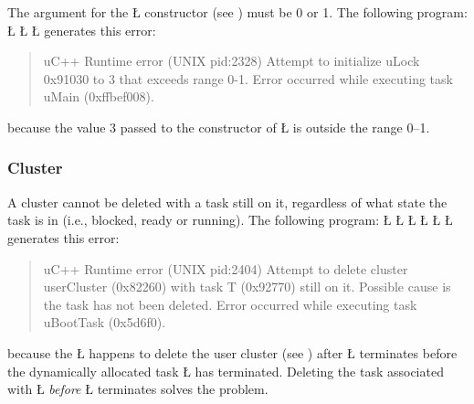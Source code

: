 \documentclass[openright,twoside]{report}
\begin{document}
The argument for the \LGinlinetrue\LGbegin\lgrinde\L{}\endlgrinde\LGend{} constructor (see ) must be 0 or 1.
The following program:
\LGinlinefalse\LGbegin\lgrinde
\L{}
\L{\LB{}}
\L{\LB{\}}}
\endlgrinde\LGend
generates this error:
\begin{quote}
\BGfont
uC++ Runtime error (UNIX pid:2328) Attempt to initialize uLock 0x91030 to 3 that exceeds range 0-1.
Error occurred while executing task uMain (0xffbef008).
\end{quote}
because the value 3 passed to the constructor of \LGinlinetrue\LGbegin\lgrinde\L{}\endlgrinde\LGend{} is outside the range 0--1.


\subsubsection{Cluster}

A cluster cannot be deleted with a task still on it, regardless of what state the task is in (i.e., blocked, ready or running).
The following program:
\LGinlinefalse\LGbegin\lgrinde
\L{}
\L{\LB{}}
\L{\LB{\};}}
\L{}
\L{\LB{}}
\L{\LB{\}}}
\endlgrinde\LGend
generates this error:
\begin{quote}
\BGfont
uC++ Runtime error (UNIX pid:2404) Attempt to delete cluster userCluster (0x82260) with task T (0x92770) still on it.
Possible cause is the task has not been deleted.
Error occurred while executing task uBootTask (0x5d6f0).
\end{quote}
because the \LGinlinetrue\LGbegin\lgrinde\L{}\endlgrinde\LGend{} happens to delete the user cluster (see ) after \LGinlinetrue\LGbegin\lgrinde\L{}\endlgrinde\LGend{} terminates before the dynamically allocated task \LGinlinetrue\LGbegin\lgrinde\L{}\endlgrinde\LGend{} has terminated.
Deleting the task associated with \LGinlinetrue\LGbegin\lgrinde\L{}\endlgrinde\LGend{} \emph{before} \LGinlinetrue\LGbegin\lgrinde\L{}\endlgrinde\LGend{} terminates solves the problem.
\end{document}
